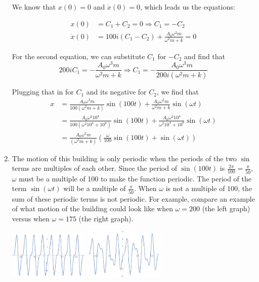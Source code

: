 \documentclass[11pt,answers]{exam}
\begin{document}
\begin{questions}
\begin{solution}
\begin{enumerate}
We know that $x(0) = 0$ and $\dot{x}(0) = 0$, which leads us the equations:

\begin{align*}
x(0) &= C_1 + C_2 = 0 \Rightarrow C_1 = -C_2 \\
\dot{x}(0) &= 100i(C_1 - C_2) + \frac{A_0\omega^2m}{\omega^2m + k} = 0
\end{align*}

For the second equation, we can substitute $C_1$ for $-C_2$ and find that 
\[
200iC_1 = -\frac{A_0\omega^3m}{\omega^2m + k} \Rightarrow C_1 = -\frac{A_0\omega^3m}{200i(\omega^2m + k)}
\]

Plugging that in for $C_1$ and its negative for $C_2$, we find that 
\begin{align*}
x &= \frac{A_0\omega^3m}{100(\omega^2m + k)}\sin(100t) + \frac{A_0\omega^2m}{\omega^2m + k}\sin{(\omega t)} \\
&= \frac{A_0\omega^3 10^4}{100(\omega^2 10^4 + 10^8)}\sin(100t) + \frac{A_0\omega^2 10^4}{\omega^2 10^4 + 10^8}\sin{(\omega t)} \\
&= \frac{A_0 \omega^2 m}{(\omega^2 m + k)}(\frac{\omega}{100}\sin{(100t)} + \sin{(\omega t)})
\end{align*}

\item The motion of this building is only periodic when the periods of the two $\sin$ terms are multiples of each other. Since the period of $\sin{(100t)}$ is $\frac{2\pi}{100} = \frac{\pi}{50}$, $\omega$ must be a multiple of 100 to make the function periodic. The period of the term $\sin{(\omega t)}$ will be a multiple of $\frac{\pi}{50}$. When $\omega$ is not a multiple of $100$, the sum of these periodic terms is not periodic. For example, compare an example of what motion of the building could look like when $\omega = 200$ (the left graph) versus when $\omega = 175$ (the right graph). 

\begin{center}
\includegraphics[width=0.3\textwidth]{yay_200.pdf}
\includegraphics[width=0.3\textwidth]{yay_.pdf}
\end{center}


\end{enumerate}
\end{solution}
\end{questions}
\end{document}
